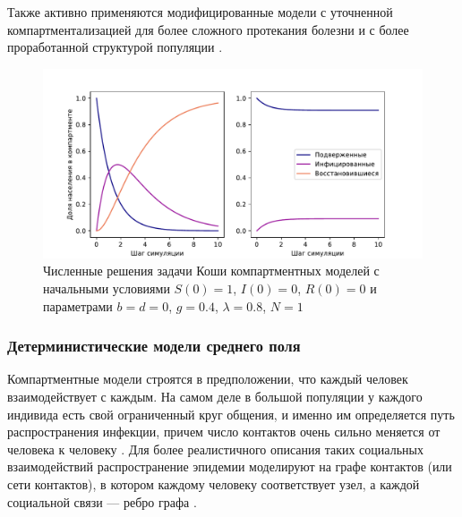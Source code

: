 \documentclass[a4paper,12pt]{article} %
\begin{document}
Также активно применяются модифицированные модели с уточненной компартментализацией для более сложного протекания болезни \cite{keeling2005networks, anderson1988epidemiology, grenfell2001travelling} и с более проработанной структурой популяции \cite{hethcote1984springer, ghani1997role, keeling1997modelling}.



\begin{figure}[]
    \centering
    \includegraphics[width=\linewidth]{images/compartment.pdf}
    \caption{Численные решения задачи Коши компартментных моделей с начальными условиями $S(0)=1$, $I(0)=0$, $R(0)=0$ и параметрами $b=d=0$, $g=0.4$, $\lambda=0.8$, $N=1$}
\end{figure}


\subsubsection{Детерминистические модели среднего поля}
Компартментные модели строятся в предположении, что каждый человек взаимодействует с каждым. На самом деле в большой популяции у каждого индивида есть свой ограниченный круг общения, и именно им определяется путь распространения инфекции, причем число контактов очень сильно меняется от человека к человеку \cite{pastor2001epidemic}. Для более реалистичного описания таких социальных взаимодействий распространение эпидемии моделируют на графе контактов (или сети контактов), в котором каждому человеку соответствует узел, а каждой социальной связи --- ребро графа \cite{sherborne2018mean}.
\end{document}
